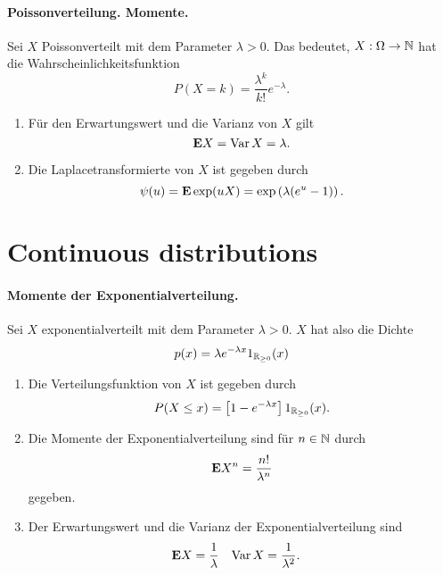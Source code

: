 \paragraph{Poissonverteilung. Momente. } 
Sei $X$ Poissonverteilt mit dem Parameter $\lambda>0$. Das bedeutet, $X:\Omega\to\mathbb N$
hat die Wahrscheinlichkeitsfunktion 
\begin{equation*}
    P(X = k) = \frac{\lambda^{k}}{k!} e^{-\lambda}.
\end{equation*}
\begin{enumerate}
    \item Für den Erwartungswert und die Varianz von $X$ gilt
        \begin{equation}
            \mathbf{E} X = \operatorname{Var} X = \lambda.
        \end{equation}
    \item Die Laplacetransformierte von $X$ ist gegeben durch
        \begin{equation}
            \psi(u) = \mathbf{E} \exp(uX) = \exp \left( \lambda(e^u - 1) \right).
        \end{equation}
\end{enumerate}


\section{Continuous distributions}

\paragraph{Momente der Exponentialverteilung.} 
Sei $X$ exponentialverteilt mit dem Parameter $\lambda>0$. $X$ hat also die Dichte
\begin{equation*}
    p(x) = \lambda e^{-\lambda x } 1_{\mathbb R_{\geq 0}}(x)
\end{equation*}
\begin{enumerate}
    \item Die Verteilungsfunktion von $X$ ist gegeben durch
        \begin{equation*}
            P( X \leq x) = \left[ 1 - e^{-\lambda x} \right] 1_{\mathbb R_{\geq 0}}(x).
        \end{equation*}
    \item Die Momente der Exponentialverteilung sind für $n\in\mathbb N$ durch
        \begin{equation*}
            \mathbf{E} X^n = \frac{n!}{\lambda^{n}}
        \end{equation*}
        gegeben. 
    \item Der Erwartungswert und die Varianz der Exponentialverteilung sind
        \begin{align*}
            \mathbf{E} X    & = \frac{1}{\lambda} & 
            \operatorname{Var} X  & = \frac{1}{\lambda^2}.
        \end{align*}
\end{enumerate}

